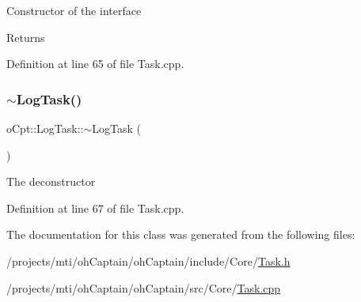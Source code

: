 Constructor of the interface \begin{DoxyReturn}{Returns}

\end{DoxyReturn}


Definition at line 65 of file Task.\+cpp.

\hypertarget{classo_cpt_1_1_log_task_a0f80363644cbe0a9c17e78198d466788}{}\label{classo_cpt_1_1_log_task_a0f80363644cbe0a9c17e78198d466788} 
\subsubsection{\texorpdfstring{$\sim$\+Log\+Task()}{~LogTask()}}
{\footnotesize\ttfamily o\+Cpt\+::\+Log\+Task\+::$\sim$\+Log\+Task (\begin{DoxyParamCaption}{ }\end{DoxyParamCaption})\hspace{0.3cm}{\ttfamily [virtual]}}

The deconstructor 

Definition at line 67 of file Task.\+cpp.



The documentation for this class was generated from the following files\+:\begin{DoxyCompactItemize}
\item 
/projects/mti/oh\+Captain/oh\+Captain/include/\+Core/\hyperlink{_task_8h}{Task.\+h}\item 
/projects/mti/oh\+Captain/oh\+Captain/src/\+Core/\hyperlink{_task_8cpp}{Task.\+cpp}\end{DoxyCompactItemize}
